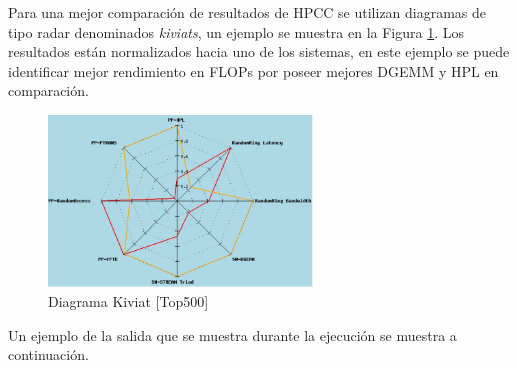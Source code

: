 \documentclass[a4paper]{report}
\begin{document}
\bigskip

Para una mejor comparación de resultados de HPCC se utilizan diagramas de tipo radar denominados {\it kiviats}, un ejemplo se muestra en la Figura \ref{fig:kiviat}.
Los resultados están normalizados hacia uno de los sistemas, en este ejemplo se puede identificar mejor rendimiento en FLOPs por poseer mejores DGEMM y HPL en comparación.

\begin{figure}[H]
\begin{center}
\includegraphics[width=7cm]{kiviat.png}
\caption{Diagrama Kiviat [Top500]}
\label{fig:kiviat}
\end{center}
\end{figure}

Un ejemplo de la salida que se muestra durante la ejecución se muestra a continuación.
\end{document}
